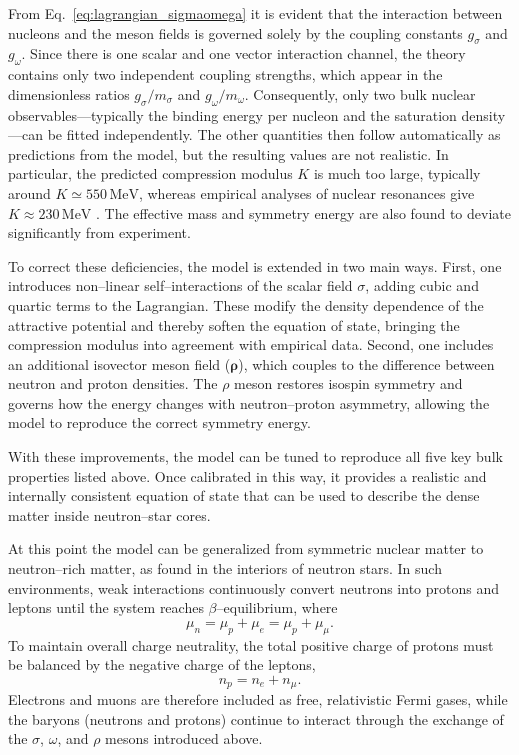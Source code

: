 From Eq.~\eqref{eq:lagrangian_sigmaomega} it is evident that the interaction
between nucleons and the meson fields is governed solely by the coupling
constants $g_{\sigma}$ and $g_{\omega}$. Since there is one scalar and one vector
interaction channel, the theory contains only two independent coupling
strengths, which appear in the dimensionless ratios $g_{\sigma}/m_{\sigma}$ and
$g_{\omega}/m_{\omega}$. Consequently, only two bulk nuclear observables—typically the
binding energy per nucleon and the saturation density—can be fitted
independently. The other quantities then follow automatically as predictions
from the model, but the resulting values are not realistic. In particular, the
predicted compression modulus $K$ is much too large, typically around
$K \simeq 550\,\mathrm{MeV}$, whereas empirical analyses of nuclear resonances give
$K \approx 230\,\mathrm{MeV}$ \cite{glendenning2000}. The effective mass and
symmetry energy are also found to deviate significantly from experiment.

To correct these deficiencies, the model is extended in two main ways.
First, one introduces non–linear self–interactions of the scalar field
$\sigma$, adding cubic and quartic terms to the Lagrangian.
These modify the density dependence of the attractive potential and thereby
soften the equation of state, bringing the compression modulus into agreement
with empirical data.
Second, one includes an additional isovector meson field ($\boldsymbol{\rho}$), which
couples to the difference between neutron and proton densities.
The $\rho$ meson restores isospin symmetry and governs how the energy changes
with neutron–proton asymmetry, allowing the model to reproduce the correct
symmetry energy.

With these improvements, the model can be tuned to
reproduce all five key bulk properties listed above.
Once calibrated in this way, it provides a realistic and internally consistent
equation of state that can be used to describe the dense matter inside neutron–star
cores.

At this point the model can be generalized from symmetric nuclear matter to
neutron–rich matter, as found in the interiors of neutron stars. In such
environments, weak interactions continuously convert neutrons into protons and
leptons until the system reaches $\beta$–equilibrium, where
\[
\mu_{n} = \mu_{p} + \mu_{e} = \mu_{p} + \mu_{\mu}.
\]
To maintain overall charge neutrality, the total positive charge of protons must
be balanced by the negative charge of the leptons,
\[
n_{p} = n_{e} + n_{\mu}.
\]
Electrons and muons are therefore included as free, relativistic Fermi gases,
while the baryons (neutrons and protons) continue to interact through the
exchange of the $\sigma$, $\omega$, and $\rho$ mesons introduced above.


